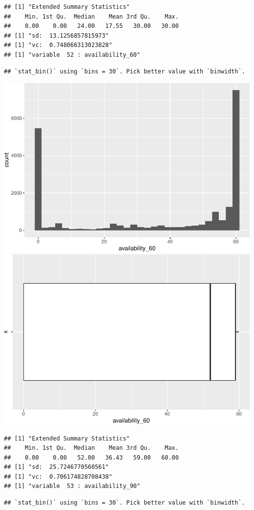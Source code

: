 \begin{verbatim}
## [1] "Extended Summary Statistics"
##    Min. 1st Qu.  Median    Mean 3rd Qu.    Max. 
##    0.00    0.00   24.00   17.55   30.00   30.00 
## [1] "sd:  13.1256857815973"
## [1] "vc:  0.748066313023828"
## [1] "variable  52 : availability_60"
\end{verbatim}

\begin{verbatim}
## `stat_bin()` using `bins = 30`. Pick better value with `binwidth`.
\end{verbatim}

\includegraphics[width=0.5\linewidth]{anal_files/figure-latex/figures-side-30}
\includegraphics[width=0.5\linewidth]{anal_files/figure-latex/figures-side-31}

\begin{verbatim}
## [1] "Extended Summary Statistics"
##    Min. 1st Qu.  Median    Mean 3rd Qu.    Max. 
##    0.00    0.00   52.00   36.43   59.00   60.00 
## [1] "sd:  25.7246770560561"
## [1] "vc:  0.706174828708438"
## [1] "variable  53 : availability_90"
\end{verbatim}

\begin{verbatim}
## `stat_bin()` using `bins = 30`. Pick better value with `binwidth`.
\end{verbatim}

